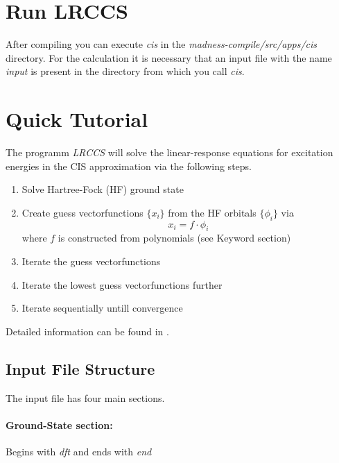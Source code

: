 \documentclass[10pt,a4paper]{scrartcl}
\begin{document}
\section{Run LRCCS}
After compiling you can execute \textit{cis} in the \textit{madness-compile/src/apps/cis} directory. For the calculation it is necessary that an input file with the name \textit{input} is present in the directory from which you call \textit{cis}.

\clearpage
\section{Quick Tutorial}
The programm \textit{LRCCS} \cite{mra-cis} will solve the linear-response equations for excitation energies in the CIS approximation via the following steps.
\begin{enumerate}
\item Solve Hartree-Fock (HF) ground state
\item Create guess vectorfunctions $\lbrace x_i \rbrace $ from the HF orbitals $\lbrace \phi_i \rbrace$ via
\[ x_i = f\cdot\phi_i \]
where $f$ is constructed from polynomials (see Keyword section)
\item Iterate the guess vectorfunctions 
\item Iterate the lowest guess vectorfunctions further
\item Iterate sequentially untill convergence
\end{enumerate}
Detailed information can be found in \cite{mra-cis}.
\subsection{Input File Structure}
The input file has four main sections.
\paragraph{Ground-State section:} Begins with \textit{dft} and ends with \textit{end}\\
\end{document}
